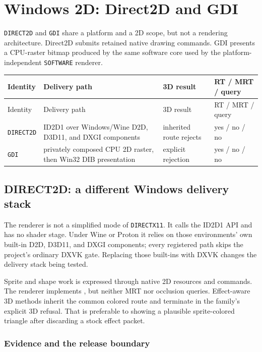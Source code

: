 \chapter{Windows 2D: Direct2D and GDI}
\label{ch:windows-2d-renderers}

\texttt{DIRECT2D} and \texttt{GDI} share a platform and a 2D scope, but not a rendering
architecture.  Direct2D submits retained native drawing commands.  GDI presents a CPU-raster
bitmap produced by the same software core used by the platform-independent
\texttt{SOFTWARE} renderer.

\begin{longtable}{p{}p{}p{}p{}}
\toprule
Identity & Delivery path & 3D result & RT / MRT / query \\
\midrule
\endfirsthead
\toprule
Identity & Delivery path & 3D result & RT / MRT / query \\
\midrule
\endhead
\texttt{DIRECT2D} & ID2D1 over Windows/Wine D2D, D3D11, and DXGI components & inherited route rejects & yes / no / no \\
\texttt{GDI} & privately composed CPU 2D raster, then Win32 DIB presentation & explicit rejection & yes / no / no \\
\bottomrule
\end{longtable}

\section{DIRECT2D: a different Windows delivery stack}

The renderer is not a simplified mode of \texttt{DIRECTX11}.  It calls the ID2D1 API and has
no shader stage.  Under Wine or Proton it relies on those environments' own built-in D2D,
D3D11, and DXGI components; every registered path skips the project's ordinary DXVK gate.
Replacing those built-ins with DXVK changes the delivery stack being tested.

Sprite and shape work is expressed through native 2D resources and commands.  The renderer
implements , but neither MRT nor occlusion queries.  Effect-aware 3D
methods inherit the common colored route and terminate in the family's explicit 3D refusal.
That is preferable to showing a plausible sprite-colored triangle after discarding a stock
effect packet.

\subsection{Evidence and the release boundary}


